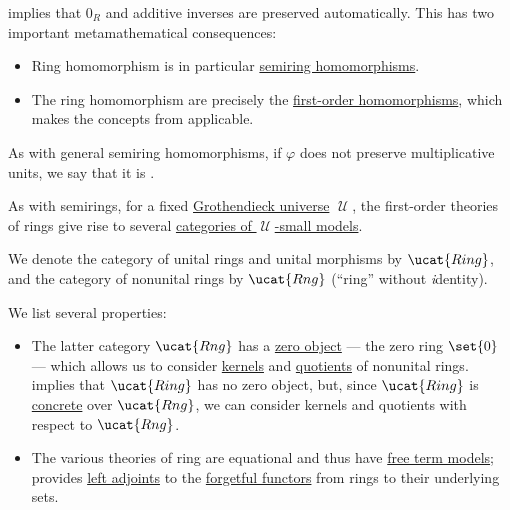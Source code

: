 \begin{definition}
\begin{thmenum}
     implies that \( 0_R \) and additive inverses are preserved automatically. This has two important metamathematical consequences:
    \begin{itemize}
      \item Ring homomorphism is in particular \hyperref[def:semiring/morphism]{semiring homomorphisms}.
      \item The ring homomorphism are precisely the \hyperref[def:fol_homomorphism]{first-order homomorphisms}, which makes the concepts from  applicable.
    \end{itemize}

    As with general semiring homomorphisms, if \( \varphi \) does not preserve multiplicative units, we say that it is .

    \mimprovised As with semirings, for a fixed \hyperref[def:grothendieck_universe]{Grothendieck universe} \( \mscrU \), the first-order theories of rings give rise to several \hyperref[def:fol_theory_model_functor/obj]{categories of \( \mscrU \)-small models}.

    We denote the category of unital rings and unital morphisms by \( \ucat{Ring} \), and the category of nonunital rings by \( \ucat{Rng} \) (\enquote{ring} without \emph{i}dentity).

    We list several properties:
    \begin{itemize}
      \item The latter category \( \ucat{Rng} \) has a \hyperref[def:universal_objects/zero]{zero object} --- the zero ring \( \set{ 0 } \) --- which allows us to consider \hyperref[def:categorical_kernels/kernel]{kernels} and \hyperref[def:categorical_quotient_object]{quotients} of nonunital rings.  implies that \( \ucat{Ring} \) has no zero object, but, since \( \ucat{Ring} \) is \hyperref[def:concrete_category]{concrete} over \( \ucat{Rng} \), we can consider kernels and quotients with respect to \( \ucat{Rng} \).

      \item The various theories of ring are equational and thus have \hyperref[def:fol_free_term_model]{free term models};  provides \hyperref[def:category_adjunction]{left adjoints} to the \hyperref[def:fol_theory_forgetful_functor/set]{forgetful functors} from rings to their underlying sets.


\end{itemize}
\end{thmenum}
\end{definition}
